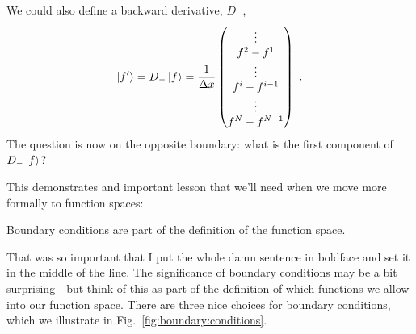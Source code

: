 We could also define a backward derivative, $D_-$,
\begin{align}
  \left|f'\right\rangle =
  D_- \left|f\right\rangle
  =
  \frac{1}{\Delta x}
  \begin{pmatrix}
    \vdots \\
    f^2 - f^1 \\
    \vdots
    \\
    f^{i}-f^{i-1}
    \\
    \vdots\\
    f^{N}-f^{N-1}
  \end{pmatrix} \ .
\end{align}
The question is now on the opposite boundary: what is the first component of $D_-\left|f\right\rangle$?


This demonstrates and important lesson that we’ll need when we move more formally to function spaces:
\begin{bigidea}
{Boundary conditions are part of the definition of the function space}.   
\end{bigidea}
That was so important that I put the whole damn sentence in boldface and set it in the middle of the line. The significance of boundary conditions may be a bit surprising---but think of this as part of the definition of which functions we allow into our function space. 
% 
There are three nice choices for boundary conditions, which we illustrate in Fig.~\ref{fig:boundary:conditions}.

%

